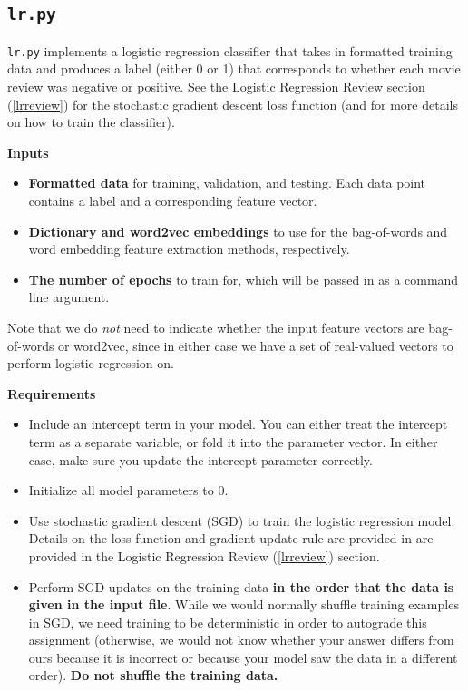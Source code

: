 \documentclass[11pt,addpoints,answers]{exam}
\begin{document}
\subsection{\texttt{lr.py}}\label{lrpy}

\lstinline{lr.py} implements a logistic regression classifier that takes in formatted training data and produces a label (either 0 or 1) that corresponds to whether each movie review was negative or positive. See the Logistic Regression Review section  (\ref{lrreview}) for the stochastic gradient descent loss function (and for more details on how to train the classifier).

{\bf Inputs }
\begin{itemize}
    \item \textbf{Formatted data} for training, validation, and testing. Each data point contains a label and a corresponding feature vector.
    \item \textbf{Dictionary and word2vec embeddings} to use for the bag-of-words and word embedding feature extraction methods, respectively.
    \item \textbf{The number of epochs} to train for, which will be passed in as a command line argument.
\end{itemize}

Note that we do \textit{not} need to indicate whether the input feature vectors are bag-of-words or word2vec, since in either case we have a set of real-valued vectors to perform logistic regression on.

\newpage %

{\bf Requirements }
\begin{itemize}
    \item Include an intercept term in your model. You can either treat the intercept term as a separate variable, or fold it into the parameter vector. In either case, make sure you update the intercept parameter correctly.
    \item Initialize all model parameters to 0.
    \item Use stochastic gradient descent (SGD) to train the logistic regression model. Details on the loss function and gradient update rule are provided in are provided in the Logistic Regression Review (\ref{lrreview}) section.
    \item Perform SGD updates on the training data \textbf{in the order that the data is given in the input file}. While we would normally shuffle training examples in SGD, we need training to be deterministic in order to autograde this assignment (otherwise, we would not know whether your answer differs from ours because it is incorrect or because your model saw the data in a different order). \textbf{Do not shuffle the training data.}
\end{itemize}
\end{document}
